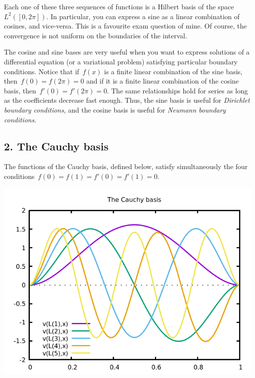 Each one of these three sequences of functions is a Hilbert basis of the
space~$L^2([0,2\pi])$.  In particular, you can express a sine as a linear
combination of cosines, and vice-versa.  This is a favourite exam question of
mine.  Of course, the convergence is not uniform on the boundaries of the
interval.

The cosine and sine bases are very useful when you want to express solutions of
a differential equation (or a variational problem) satisfying particular
boundary conditions.  Notice that if~$f(x)$ is a finite linear combination of
the sine basis, then~$f(0)=f(2\pi)=0$ and if it is a finite linear combination
of the cosine basis, then~$f'(0)=f'(2\pi)=0$.  The same relationships hold for
series as long as the coefficients decrease fast enough.  Thus, the sine basis
is useful for \emph{Dirichlet boundary conditions}, and the cosine basis is
useful for \emph{Neumann boundary conditions}.


\subsection{2. The Cauchy basis}

The functions of the Cauchy basis, defined below, satisfy simultaneously the
four conditions~$f(0)=f(1)=f'(0)=f'(1)=0$.

\includegraphics{cauchy.png}



